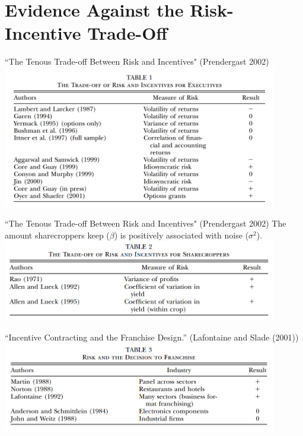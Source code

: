 \documentclass[aspectratio=169,usenames,dvipsnames]{beamer}
\begin{document}
\section{Evidence Against the Risk-Incentive Trade-Off}


\begin{frame}[c]{``The Tenous Trade-off Between Risk and Incentives" (Prendergast 2002)}
\centering
    \includegraphics[width=0.9\textwidth]{pictures/ceos_tenous.png}
\end{frame}


\begin{frame}[c]{``The Tenous Trade-off Between Risk and Incentives" (Prendergast 2002)}
The amount sharecroppers keep ($\beta$) is positively associated with noise ($\sigma^2$).
\centering
    \includegraphics[width=0.9\textwidth]{pictures/sharecroppers.png}
\end{frame}

\begin{frame}[c]{``Incentive Contracting and the Franchise Design.” (Lafontaine and Slade (2001))}
\centering
    \includegraphics[width=0.9\textwidth]{pictures/franchise_risk.png}
\end{frame}
\end{document}
